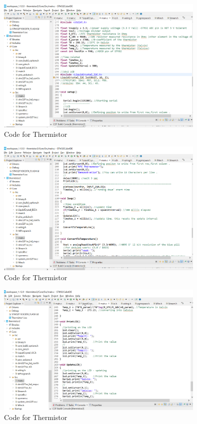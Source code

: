 \documentclass[12pt]{article}
\begin{document}
\begin{figure}[h]
    \centering
    \includegraphics[width=10cm]{Code1.png}
    \caption{Code for Thermistor}
    \label{fig:galaxy}
\end{figure}
\begin{figure}[h]
    \centering
    \includegraphics[width=10cm]{Code2.png}
    \caption{Code for Thermistor}
    \label{fig:galaxy}
\end{figure}
\begin{figure}[h]
    \centering
    \includegraphics[width=10cm]{Code3.png}
    \caption{Code for Thermistor}
    \label{fig:galaxy}
\end{figure}
\end{document}
